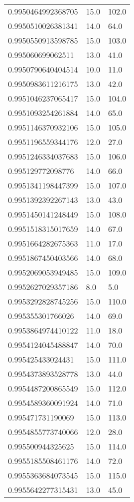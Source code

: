 \begin{center}
\begin{supertabular}[H]{p{0.30\textwidth}p{0.05\textwidth}p{0.05\textwidth}}
0.9950464992368705 & 15.0 & 102.0 \\ 
0.9950510026381341 & 14.0 & 64.0 \\ 
0.9950550913598785 & 15.0 & 103.0 \\ 
0.995060699062511 & 13.0 & 41.0 \\ 
0.9950790640404514 & 10.0 & 11.0 \\ 
0.9950983611216175 & 13.0 & 42.0 \\ 
0.9951046237065417 & 15.0 & 104.0 \\ 
0.9951093254261884 & 14.0 & 65.0 \\ 
0.9951146370932106 & 15.0 & 105.0 \\ 
0.9951196559344176 & 12.0 & 27.0 \\ 
0.9951246334037683 & 15.0 & 106.0 \\ 
0.995129772098776 & 14.0 & 66.0 \\ 
0.9951341198447399 & 15.0 & 107.0 \\ 
0.9951392392267143 & 13.0 & 43.0 \\ 
0.9951450141248449 & 15.0 & 108.0 \\ 
0.9951518315017659 & 14.0 & 67.0 \\ 
0.9951664282675363 & 11.0 & 17.0 \\ 
0.9951867450403566 & 14.0 & 68.0 \\ 
0.9952069053949485 & 15.0 & 109.0 \\ 
0.9952627029357186 & 8.0 & 5.0 \\ 
0.9953292828745256 & 15.0 & 110.0 \\ 
0.995355301766026 & 14.0 & 69.0 \\ 
0.9953864974410122 & 11.0 & 18.0 \\ 
0.9954124045488847 & 14.0 & 70.0 \\ 
0.995425433024431 & 15.0 & 111.0 \\ 
0.9954373893528778 & 13.0 & 44.0 \\ 
0.9954487200865549 & 15.0 & 112.0 \\ 
0.9954589360091924 & 14.0 & 71.0 \\ 
0.995471731190069 & 15.0 & 113.0 \\ 
0.9954855773740066 & 12.0 & 28.0 \\ 
0.995500944325625 & 15.0 & 114.0 \\ 
0.9955185508461176 & 14.0 & 72.0 \\ 
0.9955363684073545 & 15.0 & 115.0 \\ 
0.9955642277315431 & 13.0 & 45.0 \\ 

\end{supertabular}
\end{center}
